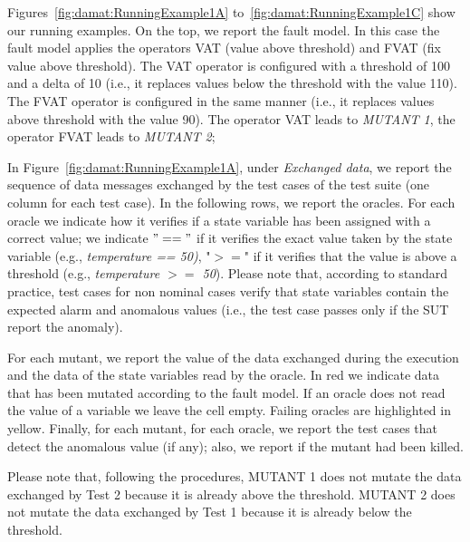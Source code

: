 Figures~\ref{fig:damat:RunningExample1A} to~\ref{fig:damat:RunningExample1C} show our running examples. On the top, we report the fault model. In this case the fault model applies the operators VAT (value above threshold) and FVAT (fix value above threshold). The VAT operator is configured with a threshold of 100 and a delta of 10 (i.e., it replaces values below the threshold with the value 110). The FVAT operator is configured in the same manner (i.e., it replaces values above threshold with the value 90). The operator VAT leads to \emph{MUTANT 1}, the operator FVAT leads to \emph{MUTANT 2}; 

In Figure~\ref{fig:damat:RunningExample1A}, under \emph{Exchanged data}, we report the sequence of data messages exchanged by the test cases of the test suite (one column for each test case).
In the following rows, we report the oracles. For each oracle we indicate how it verifies if a state variable has been assigned with a correct value; we indicate $"=="$ if it verifies the exact value taken by the state variable (e.g., \emph{temperature == 50)}, "$>=$" if it verifies that the value is above a threshold (e.g., \emph{temperature $>=$ 50}). Please note that, according to standard practice, test cases for non nominal cases verify that state variables contain the expected alarm and anomalous values (i.e., the test case passes only if the SUT report the anomaly). 

For each mutant, we report the value of the data exchanged during the execution and the data of the state variables read by the oracle. In red we indicate data that has been mutated according to the fault model. 
If an oracle does not read the value of a variable we leave the cell empty.
Failing oracles are highlighted in yellow.
Finally, for each mutant, for each oracle, we report the test cases that detect the anomalous value (if any); also, we report if the mutant had been killed.


Please note that, following the \APPR procedures, MUTANT 1 does not mutate the data exchanged by Test 2 because it is already above the threshold. MUTANT 2 does not mutate the data exchanged by Test 1 because it is already below the threshold.

